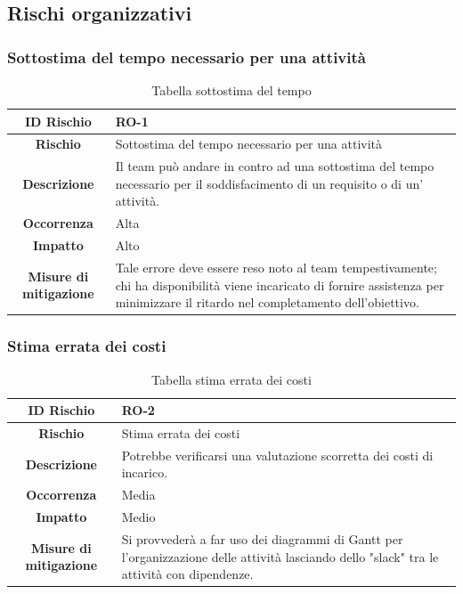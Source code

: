 \documentclass[10pt, a4paper]{article}
\begin{document}
{%

\subsection{Rischi organizzativi}

\subsubsection{Sottostima del tempo necessario per una attività}

{\renewcommand{\arraystretch}{1.5}
\begin{table}[h]
\begin{tabularx}{\textwidth}{c|X}
\textbf{ID Rischio} & RO-1 \\
\hline
\textbf{Rischio} & Sottostima del tempo necessario per una attività\\
\hline
\textbf{Descrizione} & Il team può andare in contro ad una sottostima del tempo necessario per il soddisfacimento di un requisito o di un' attività.\\
\hline
\textbf{Occorrenza} & Alta\\
\hline
\textbf{Impatto} & Alto\\
\hline
\textbf{Misure di mitigazione} & Tale errore deve essere reso noto al team tempestivamente; chi ha disponibilità viene incaricato di fornire assistenza per minimizzare il ritardo nel completamento dell'obiettivo.\\
\end{tabularx}
\caption{Tabella sottostima del tempo}
\end{table}

\subsubsection{Stima errata dei costi}

{\renewcommand{\arraystretch}{1.5}
\begin{table}[H]
\begin{tabularx}{\textwidth}{c|X}
\textbf{ID Rischio} & RO-2 \\
\hline
\textbf{Rischio} & Stima errata dei costi \\
\hline
\textbf{Descrizione} & Potrebbe verificarsi una valutazione scorretta dei costi di incarico.\\
\hline
\textbf{Occorrenza} & Media\\
\hline
\textbf{Impatto} & Medio\\
\hline
\textbf{Misure di mitigazione} & Si provvederà a far uso dei diagrammi di Gantt per l'organizzazione delle attività lasciando dello "slack" tra le attività con dipendenze.\\
\end{tabularx}
\caption{Tabella stima errata dei costi}
\end{table}



}}}
\end{document}
